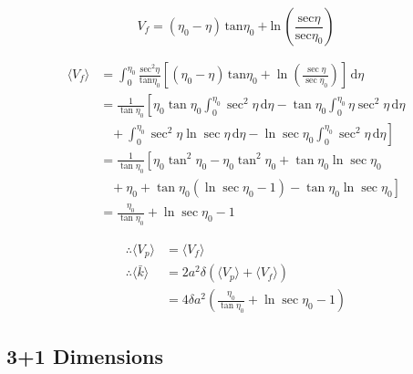 \documentclass[12pt]{article}
\begin{document}
\begin{equation}
V_f = (\eta_0 - \eta) \, \mathrm{tan}\eta_0 + \mathrm{ln} \, \left(\frac{\mathrm{sec}\eta}{\mathrm{sec}\eta_0}\right)
\end{equation}

\begin{equation}
\begin{split}
\langle V_f \rangle &= \int_0^{\eta_0} \! \frac{\mathrm{sec}^2\eta}{\mathrm{tan}\eta_0} \left[ (\eta_0 - \eta) \, \mathrm{tan}\eta_0 + \ln\left(\frac{\sec\eta}{\sec\eta_0}\right) \right] \, \mathrm{d}\eta \\
  &= \frac{1}{\tan\eta_0} \left[ \eta_0\tan\eta_0 \int_0^{\eta_0} \! \sec^2\eta \, \mathrm{d}\eta - \tan\eta_0 \int_0^{\eta_0} \! \eta\sec^2\eta \, \mathrm{d}\eta \right. \\ & \left.\,\,\,\,\, + \int_0^{\eta_0} \! \sec^2\eta\ln\sec\eta \, \mathrm{d}\eta - \ln\sec\eta_0 \int_0^{\eta_0} \! \sec^2\eta \, \mathrm{d}\eta \right] \\
  &= \frac{1}{\tan\eta_0} \left[ \eta_0\tan^2\eta_0 - \eta_0\tan^2\eta_0 + \tan\eta_0\ln\sec\eta_0 \right. \\ & \left. \,\,\,\,\, + \eta_0 + \tan\eta_0\left(\ln\sec\eta_0 - 1\right) - \tan\eta_0\ln\sec\eta_0 \right] \\
  &= \frac{\eta_0}{\tan\eta_0} + \ln\sec\eta_0 - 1
\end{split}
\end{equation}

\begin{equation}
\begin{split}
\therefore \langle V_p \rangle &= \langle V_f \rangle \\
\therefore \langle \bar{k} \rangle &= 2a^2\delta \left( \langle V_p \rangle + \langle V_f \rangle \right) \\
  &= 4 \delta a^2 \left( \frac{\eta_0}{\tan\eta_0} + \ln\sec\eta_0 - 1 \right)
\end{split}
\end{equation}

\subsection{3+1 Dimensions}
\end{document}
